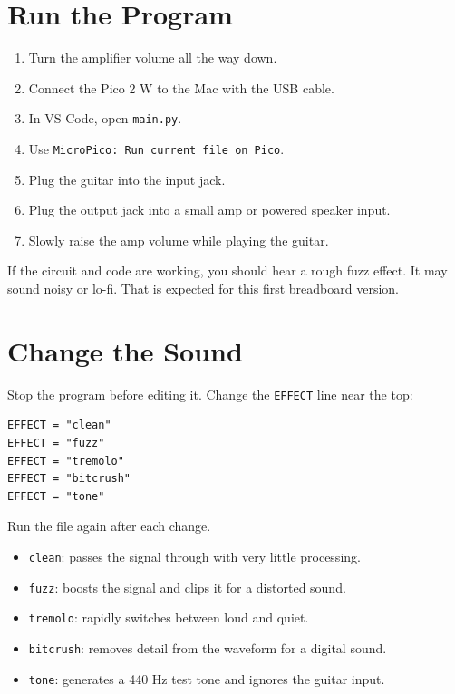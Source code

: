 \documentclass[11pt,letterpaper]{article}
\begin{document}
\section*{Run the Program}
\begin{enumerate}
    \item Turn the amplifier volume all the way down.
    \item Connect the Pico 2 W to the Mac with the USB cable.
    \item In VS Code, open \texttt{main.py}.
    \item Use \texttt{MicroPico: Run current file on Pico}.
    \item Plug the guitar into the input jack.
    \item Plug the output jack into a small amp or powered speaker input.
    \item Slowly raise the amp volume while playing the guitar.
\end{enumerate}

If the circuit and code are working, you should hear a rough fuzz effect. It may sound noisy or lo-fi. That is expected for this first breadboard version.

\section*{Change the Sound}
Stop the program before editing it. Change the \texttt{EFFECT} line near the top:

\begin{verbatim}
EFFECT = "clean"
EFFECT = "fuzz"
EFFECT = "tremolo"
EFFECT = "bitcrush"
EFFECT = "tone"
\end{verbatim}

Run the file again after each change.

\begin{itemize}
    \item \texttt{clean}: passes the signal through with very little processing.
    \item \texttt{fuzz}: boosts the signal and clips it for a distorted sound.
    \item \texttt{tremolo}: rapidly switches between loud and quiet.
    \item \texttt{bitcrush}: removes detail from the waveform for a digital sound.
    \item \texttt{tone}: generates a 440 Hz test tone and ignores the guitar input.
\end{itemize}
\end{document}
